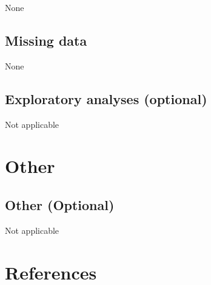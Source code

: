\documentclass[]{article}
\begin{document}
None

\hypertarget{missing-data}{%
\subsection{Missing data}\label{missing-data}}

None

\hypertarget{exploratory-analyses-optional}{%
\subsection{Exploratory analyses
(optional)}\label{exploratory-analyses-optional}}

Not applicable

\hypertarget{other}{%
\section{Other}\label{other}}

\hypertarget{other-optional}{%
\subsection{Other (Optional)}\label{other-optional}}

Not applicable

\hypertarget{references}{%
\section{References}\label{references}}

\hypertarget{section}{%
\subsection{}\label{section}}

\vspace{-2pc}
\setlength{\parindent}{-0.5in}
\setlength{\leftskip}{-1in}
\setlength{\parskip}{8pt}

\noindent
\end{document}
